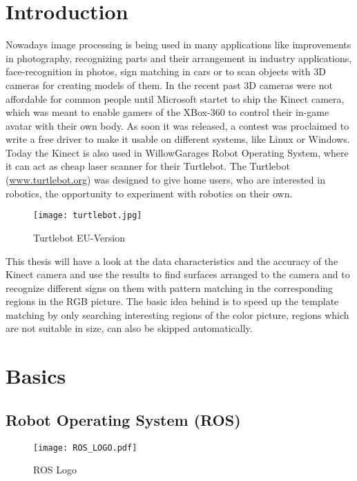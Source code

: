 \chapter{Introduction}
\graphicspath{{./Introduction/img/}}

Nowadays image processing is being used in many applications like improvements in
photography, recognizing parts and their arrangement in industry applications, 
face-recognition in photos, sign matching in cars or to scan objects with 
3D cameras for creating models of them. In the recent past 3D cameras were 
not affordable for common people until Microsoft startet to ship the Kinect 
camera, which was meant to enable gamers of the XBox-360 to control their in-game 
avatar with their own body. As soon it was released, a contest was proclaimed 
to write a free driver to make it usable on different systems, like Linux or Windows.
Today the Kinect is also used in WillowGarages Robot Operating System,
where it can act as cheap laser scanner for their Turtlebot. The Turtlebot 
(\url{www.turtlebot.org}) was designed to give home users, who are interested in 
robotics, the opportunity to experiment with robotics on their own.

\begin{figure}[htp]
\begin{center}
  \texttt{[image: turtlebot.jpg]}
  \caption{Turtlebot EU-Version}
  \label{figure:turtlebot}
\end{center}
\end{figure}

This thesis will have a look at the data characteristics and the accuracy of the
Kinect camera and use the results to find surfaces arranged to the camera and to 
recognize different signs on them with pattern matching in the corresponding regions
in the RGB picture. The basic idea behind is to speed up the template matching 
by only searching interesting regions of the color picture, regions which are not
suitable in size, can also be skipped automatically.

\chapter{Basics}

\section{Robot Operating System (ROS)}
  
\begin{figure}[htp]
	\centering
	\texttt{[image: ROS\_LOGO.pdf]}
	\caption{ROS Logo}
\end{figure} 

